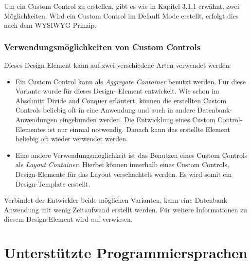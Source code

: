Um ein Custom Control zu erstellen, gibt es wie in Kapitel 3.1.1 erwähnt, zwei Möglichkeiten.
Wird ein Custom Control im Default Mode erstellt, erfolgt dies nach dem WYSIWYG Prinzip. 


\subsubsection{Verwendungsmöglichkeiten von Custom Controls} 
\label{sec:4designelemente} 

Dieses Design-Element kann auf zwei verschiedene Arten verwendet werden:\\
\newline
\begin{itemize}
\item Ein Custom Control kann als \textit{Aggregate Container} benutzt werden. Für diese Variante wurde für dieses Design-
Element entwickelt.
Wie schon im Abschnitt Divide and Conquer erläutert, können die erstellten Custom Controls beliebig oft in eine Anwendung und auch in andere Datenbank-
Anwendungen eingebunden werden. Die Entwicklung eines Custom Control-Elementes ist nur einmal notwendig. Danach kann das erstellte Element beliebig oft
wieder verwendet  werden. 
\item Eine andere Verwendungsmöglichkeit ist das Benutzen eines Custom Controls als \textit{Layout Container}. Hierbei können innerhalb eines Custom Controls, Design-Elemente für das Layout verschachtelt werden. Es wird somit ein Design-Template erstellt.
\end{itemize}

Verbindet der Entwickler beide möglichen Varianten, kann eine Datenbank Anwendung mit wenig Zeitaufwand erstellt werden. Für weitere Informationen zu 
diesem Design-Element wird auf \cite{donelly} verwiesen.




\section{Unterstützte Programmiersprachen}
\label{sec:4designelemente}

